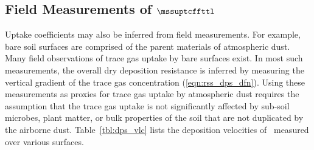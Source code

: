 \documentclass[12pt,twoside]{book}
\begin{document}
\subsection[Field Measurements of Mass Uptake]{Field Measurements of $\mssuptcffttl$}
Uptake coefficients may also be inferred from field measurements.
For example, bare soil surfaces are comprised of the parent materials
of atmospheric dust.
Many field observations of trace gas uptake by bare surfaces exist.
In most such measurements, the overall dry deposition resistance is
inferred by measuring the vertical gradient of the trace gas
concentration (\ref{eqn:rss_dps_dfn}). 
Using these measurements as proxies for trace gas uptake by
atmospheric dust requires the assumption that the trace gas uptake 
is not significantly affected by sub-soil microbes, plant matter, or
bulk properties of the soil that are not duplicated by the airborne
dust. 
Table~\ref{tbl:dps_vlc} lists the deposition velocities of \Ot\
measured over various surfaces.
\end{document}
